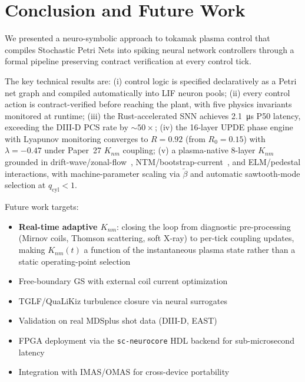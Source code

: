 \documentclass[twocolumn,preprintnumbers,amsmath,amssymb,prl,floatfix]{revtex4-2}
\begin{document}
\section{Conclusion and Future Work}
\label{sec:conclusion}

We presented a neuro-symbolic approach to tokamak plasma control
that compiles Stochastic Petri Nets into spiking neural network
controllers through a formal pipeline preserving contract
verification at every control tick.

The key technical results are:
(i) control logic is specified declaratively as a Petri net graph
and compiled automatically into LIF neuron pools;
(ii) every control action is contract-verified before reaching the
plant, with five physics invariants monitored at runtime;
(iii) the Rust-accelerated SNN achieves \SI{2.1}{\micro\second}
P50 latency, exceeding the DIII-D PCS rate by ${\sim}50\times$;
(iv) the 16-layer UPDE phase engine with Lyapunov monitoring
converges to $R = 0.92$ (from $R_0 = 0.15$) with
$\lambda = -0.47$ under Paper~27 $K_{nm}$ coupling;
(v) a plasma-native 8-layer $K_{nm}$ grounded in
drift-wave/zonal-flow~\cite{diamond2005},
NTM/bootstrap-current~\cite{lahaye2006}, and
ELM/pedestal interactions, with machine-parameter scaling
via $\tilde{\beta}$ and automatic sawtooth-mode selection
at $q_\mathrm{cyl} < 1$.

Future work targets:
\begin{itemize}
  \item \textbf{Real-time adaptive $K_{nm}$}: closing the loop
        from diagnostic pre-processing (Mirnov coils, Thomson
        scattering, soft X-ray) to per-tick coupling updates,
        making $K_{nm}(t)$ a function of the instantaneous
        plasma state rather than a static operating-point selection
  \item Free-boundary GS with external coil current optimization
  \item TGLF/QuaLiKiz turbulence closure via neural surrogates
  \item Validation on real MDSplus shot data (DIII-D, EAST)
  \item FPGA deployment via the \texttt{sc-neurocore} HDL backend
        for sub-microsecond latency
  \item Integration with IMAS/OMAS for cross-device portability
\end{itemize}
\end{document}
